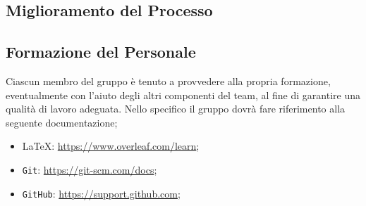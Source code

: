     \subsection{Miglioramento del Processo}

    \subsection{Formazione del Personale}
        Ciascun membro del gruppo è tenuto a provvedere alla propria formazione, eventualmente con l'aiuto degli altri componenti del team, al fine di garantire una qualità di lavoro adeguata.
        Nello specifico il gruppo dovrà fare riferimento alla seguente documentazione;
                \begin{itemize}
                    \item {\LaTeX}: \href{https://www.overleaf.com/learn}{https://www.overleaf.com/learn};
                    \item \texttt{Git}: \href{https://git-scm.com/docs}{https://git-scm.com/docs};
                    \item \texttt{GitHub}: \href{https://support.github.com}{https://support.github.com};
                \end{itemize}
